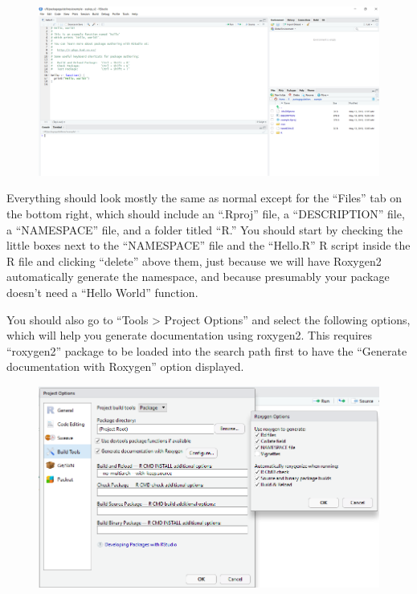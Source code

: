 \documentclass[]{book}
\begin{document}
\begin{figure}
\centering
\includegraphics{images/packageSS/projectinit.PNG}
\caption{}
\end{figure}

Everything should look mostly the same as normal except for the
``Files'' tab on the bottom right, which should include an ``.Rproj''
file, a ``DESCRIPTION'' file, a ``NAMESPACE'' file, and a folder titled
``R.'' You should start by checking the little boxes next to the
``NAMESPACE'' file and the ``Hello.R'' R script inside the R file and
clicking ``delete'' above them, just because we will have Roxygen2
automatically generate the namespace, and because presumably your
package doesn't need a ``Hello World'' function.

You should also go to ``Tools \textgreater{} Project Options'' and
select the following options, which will help you generate documentation
using roxygen2. This requires ``roxygen2'' package to be loaded into the
search path first to have the ``Generate documentation with Roxygen''
option displayed.

\begin{figure}
\centering
\includegraphics{images/packageSS/userox.PNG}
\caption{}
\end{figure}
\end{document}
